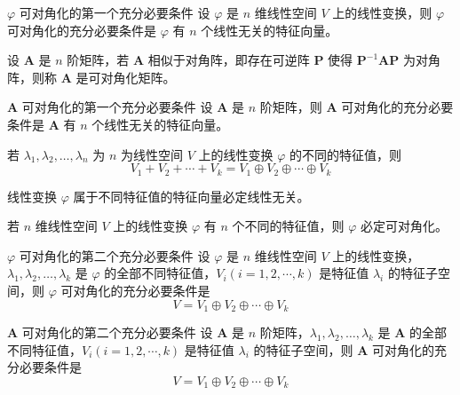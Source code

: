 \begin{theorem}{$\varphi$ 可对角化的第一个充分必要条件}
    设 $\varphi$ 是 $n$ 维线性空间 $V$ 上的线性变换，则 $\varphi$ 可对角化的充分必要条件是 $\varphi$ 有 $n$ 个线性无关的特征向量。
\end{theorem}

\begin{definition}
    设 $\bm{A}$ 是 $n$ 阶矩阵，若 $\bm{A}$ 相似于对角阵，即存在可逆阵 $\bm{P}$ 使得 $\bm{P}^{-1}\bm{AP}$ 为对角阵，则称 $\bm{A}$ 是可对角化矩阵。
\end{definition}

\begin{theorem}{$\bm{A}$ 可对角化的第一个充分必要条件}
    设 $\bm{A}$ 是 $n$ 阶矩阵，则 $\bm{A}$ 可对角化的充分必要条件是 $\bm{A}$ 有 $n$ 个线性无关的特征向量。
\end{theorem}

\begin{theorem}
    若 $\lambda_1, \lambda_2, \ldots , \lambda_n$ 为 $n$ 为线性空间 $V$ 上的线性变换 $\varphi$ 的不同的特征值，则
    \[
        V_1 + V_2 + \cdots + V_k = V_1 \oplus V_2 \oplus \cdots \oplus V_k
    \]
\end{theorem}

\begin{corollary}
    线性变换 $\varphi$ 属于不同特征值的特征向量必定线性无关。
\end{corollary}

\begin{corollary}
    若 $n$ 维线性空间 $V$ 上的线性变换 $\varphi$ 有 $n$ 个不同的特征值，则 $\varphi$ 必定可对角化。
\end{corollary}

\begin{theorem}{$\varphi$ 可对角化的第二个充分必要条件}
    设 $\varphi$ 是 $n$ 维线性空间 $V$ 上的线性变换，$\lambda_1, \lambda_2, \ldots , \lambda_k$ 是 $\varphi$ 的全部不同特征值，$V_i(i = 1, 2, \cdots, k)$ 是特征值 $\lambda_i$ 的特征子空间，则 $\varphi$ 可对角化的充分必要条件是
    \[
        V = V_1 \oplus V_2 \oplus \cdots \oplus V_k
    \]
\end{theorem}

\begin{theorem}{$\bm{A}$ 可对角化的第二个充分必要条件}
    设 $\bm{A}$ 是 $n$ 阶矩阵，$\lambda_1, \lambda_2, \ldots , \lambda_k$ 是 $\bm{A}$ 的全部不同特征值，$V_i(i = 1, 2, \cdots, k)$ 是特征值 $\lambda_i$ 的特征子空间，则 $\bm{A}$ 可对角化的充分必要条件是
    \[
        V = V_1 \oplus V_2 \oplus \cdots \oplus V_k
    \]
\end{theorem}

